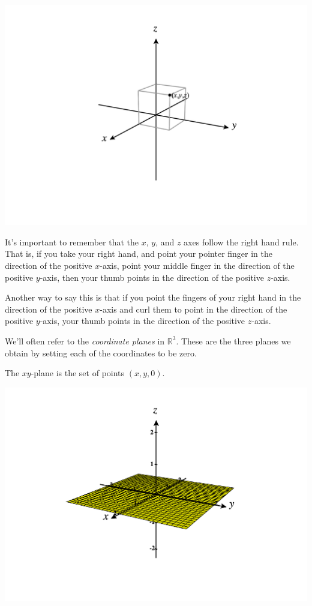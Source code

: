 \documentclass{ximera}
\begin{document}
\begin{image}
\includegraphics[width=\textwidth]{CalcPlot3D-3d_coords}
\end{image}

It's important to remember that the $x$, $y$, and $z$ axes follow the right hand rule. That is, if you take your right hand, and point your pointer finger in the direction of the positive $x$-axis, point your middle finger in the direction of the positive $y$-axis, then your thumb points in the direction of the positive $z$-axis.

Another way to say this is that if you point the fingers of your right hand in the direction of the positive $x$-axis and curl them to point in the direction of the positive $y$-axis, your thumb points in the direction of the positive $z$-axis.


We'll often refer to the \emph{coordinate planes} in $\mathbb{R}^3$. These are the three planes we obtain by setting each of the coordinates to be zero.

The $xy$-plane is the set of points $(x,y,0)$.
\begin{image}
\includegraphics[width=\textwidth]{CalcPlot3D-xy_plane}
\end{image}
\end{document}
